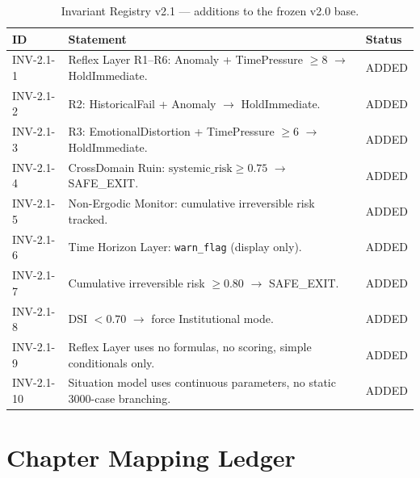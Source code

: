 \begin{table}[ht]
\centering
\scriptsize
\begin{tabularx}{\linewidth}{lXl}
\toprule
\textbf{ID} & \textbf{Statement} & \textbf{Status} \\
\midrule

INV-2.1-1 & Reflex Layer R1--R6: Anomaly + TimePressure $\ge 8$
$\to$ HoldImmediate. & ADDED \\

INV-2.1-2 & R2: HistoricalFail + Anomaly $\to$ HoldImmediate.
& ADDED \\

INV-2.1-3 & R3: EmotionalDistortion + TimePressure $\ge 6$ $\to$
HoldImmediate. & ADDED \\

INV-2.1-4 & CrossDomain Ruin: $\mathrm{systemic\_risk} \ge 0.75$
$\to$ SAFE\_EXIT. & ADDED \\

INV-2.1-5 & Non-Ergodic Monitor: cumulative irreversible risk
tracked. & ADDED \\

INV-2.1-6 & Time Horizon Layer: \texttt{warn\_flag} (display only).
& ADDED \\

INV-2.1-7 & Cumulative irreversible risk $\ge 0.80$ $\to$
SAFE\_EXIT. & ADDED \\

INV-2.1-8 & DSI $< 0.70$ $\to$ force Institutional mode. & ADDED \\

INV-2.1-9 & Reflex Layer uses no formulas, no scoring, simple
conditionals only. & ADDED \\

INV-2.1-10 & Situation model uses continuous parameters, no static
3000-case branching. & ADDED \\

\bottomrule
\end{tabularx}
\caption[v2.1 invariant registry]{Invariant Registry v2.1 ---
additions to the frozen v2.0 base.}
\label{tab:v21-invariant-registry-table}
\end{table}

\section{Chapter Mapping Ledger}
\label{sec:chapter-mapping-ledger}

